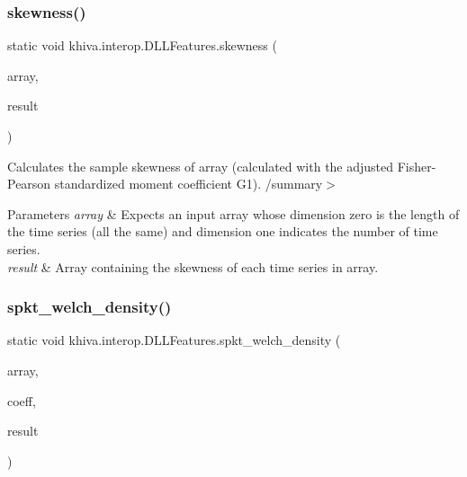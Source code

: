 \mbox{\label{classkhiva_1_1interop_1_1_d_l_l_features_a4f22bda60315614bcc21fd2d7467f821}} 
\subsubsection{\texorpdfstring{skewness()}{skewness()}}
{\footnotesize\ttfamily static void khiva.\+interop.\+D\+L\+L\+Features.\+skewness (\begin{DoxyParamCaption}\item[{\mbox{[}\+In\mbox{]} ref Int\+Ptr}]{array,  }\item[{\mbox{[}\+Out\mbox{]} out Int\+Ptr}]{result }\end{DoxyParamCaption})\hspace{0.3cm}{\ttfamily [static]}}



Calculates the sample skewness of array (calculated with the adjusted Fisher-\/\+Pearson standardized moment coefficient G1). /summary$>$ 
\begin{DoxyParams}{Parameters}
{\em array} & Expects an input array whose dimension zero is the length of the time series (all the same) and dimension one indicates the number of time series.\\
\hline
{\em result} & Array containing the skewness of each time series in array.\\
\hline
\end{DoxyParams}


\mbox{\label{classkhiva_1_1interop_1_1_d_l_l_features_aa81ee009b068590d2d685bcaa3cdf4a9}} 
\subsubsection{\texorpdfstring{spkt\+\_\+welch\+\_\+density()}{spkt\_welch\_density()}}
{\footnotesize\ttfamily static void khiva.\+interop.\+D\+L\+L\+Features.\+spkt\+\_\+welch\+\_\+density (\begin{DoxyParamCaption}\item[{\mbox{[}\+In\mbox{]} ref Int\+Ptr}]{array,  }\item[{\mbox{[}\+In\mbox{]} ref int}]{coeff,  }\item[{\mbox{[}\+Out\mbox{]} out Int\+Ptr}]{result }\end{DoxyParamCaption})\hspace{0.3cm}{\ttfamily [static]}}



